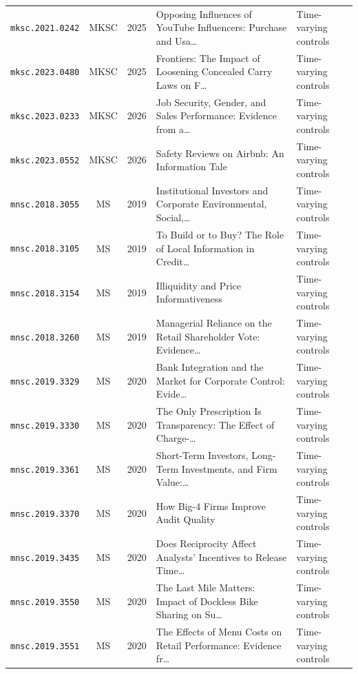 \begin{longtable}{lccp{}l}
\texttt{mksc.2021.0242} & MKSC & 2025 & \raggedright Opposing Influences of YouTube Influencers: Purchase and Usa\ldots{} & Time-varying controls \\
\texttt{mksc.2023.0480} & MKSC & 2025 & \raggedright Frontiers: The Impact of Loosening Concealed Carry Laws on F\ldots{} & Time-varying controls \\
\texttt{mksc.2023.0233} & MKSC & 2026 & \raggedright Job Security, Gender, and Sales Performance: Evidence from a\ldots{} & Time-varying controls \\
\texttt{mksc.2023.0552} & MKSC & 2026 & \raggedright Safety Reviews on Airbnb: An Information Tale & Time-varying controls \\
\texttt{mnsc.2018.3055} & MS & 2019 & \raggedright Institutional Investors and Corporate Environmental, Social,\ldots{} & Time-varying controls \\
\texttt{mnsc.2018.3105} & MS & 2019 & \raggedright To Build or to Buy? The Role of Local Information in Credit\ldots{} & Time-varying controls \\
\texttt{mnsc.2018.3154} & MS & 2019 & \raggedright Illiquidity and Price Informativeness & Time-varying controls \\
\texttt{mnsc.2018.3260} & MS & 2019 & \raggedright Managerial Reliance on the Retail Shareholder Vote: Evidence\ldots{} & Time-varying controls \\
\texttt{mnsc.2019.3329} & MS & 2020 & \raggedright Bank Integration and the Market for Corporate Control: Evide\ldots{} & Time-varying controls \\
\texttt{mnsc.2019.3330} & MS & 2020 & \raggedright The Only Prescription Is Transparency: The Effect of Charge-\ldots{} & Time-varying controls \\
\texttt{mnsc.2019.3361} & MS & 2020 & \raggedright Short-Term Investors, Long-Term Investments, and Firm Value:\ldots{} & Time-varying controls \\
\texttt{mnsc.2019.3370} & MS & 2020 & \raggedright How Big-4 Firms Improve Audit Quality & Time-varying controls \\
\texttt{mnsc.2019.3435} & MS & 2020 & \raggedright Does Reciprocity Affect Analysts' Incentives to Release Time\ldots{} & Time-varying controls \\
\texttt{mnsc.2019.3550} & MS & 2020 & \raggedright The Last Mile Matters: Impact of Dockless Bike Sharing on Su\ldots{} & Time-varying controls \\
\texttt{mnsc.2019.3551} & MS & 2020 & \raggedright The Effects of Menu Costs on Retail Performance: Evidence fr\ldots{} & Time-varying controls \\

\end{longtable}
